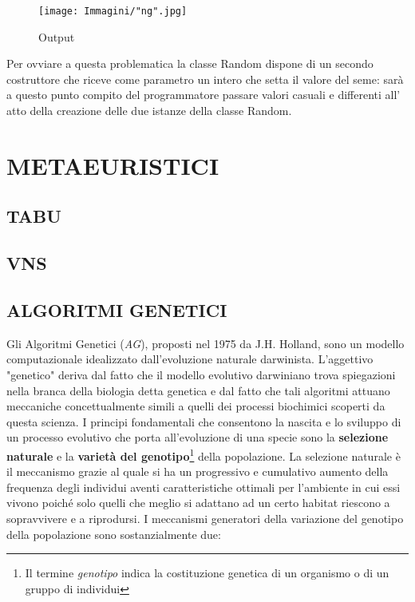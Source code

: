 \documentclass[11pt]{article}
\begin{document}
\begin{figure}[htbp]
    \centering
    \texttt{[image: Immagini/"ng".jpg]}
    \caption{Output}
\end{figure}

Per ovviare a questa problematica la classe Random dispone di un secondo costruttore che riceve come parametro un intero che setta il valore del seme: sarà a questo punto compito del programmatore passare valori casuali e  differenti all' atto della creazione delle due istanze della classe Random.


\section*{METAEURISTICI}
\label{sec:MetaEuristiciS}

\subsection*{TABU}
\label{sec:TabuS}

\subsection*{VNS}
\label{sec:VNSS}

\subsection*{ALGORITMI GENETICI}
\label{sec:GeneticoS}

Gli Algoritmi Genetici (\textit{AG}), proposti nel 1975 da J.H. Holland, sono un modello computazionale idealizzato dall'evoluzione naturale darwinista. L'aggettivo "genetico" deriva dal fatto che il modello evolutivo darwiniano trova spiegazioni nella branca della biologia detta genetica e dal fatto che tali algoritmi attuano meccaniche concettualmente simili a quelli dei processi biochimici scoperti da questa scienza. I principi fondamentali che consentono la nascita e lo sviluppo di un processo evolutivo che porta all'evoluzione di una specie sono la \textbf{selezione naturale} e la \textbf{varietà del genotipo}\footnote{Il termine \textit{genotipo} indica la costituzione genetica di un organismo o di un gruppo di individui} della popolazione.
La selezione naturale è il meccanismo grazie al quale si ha un progressivo e cumulativo aumento della frequenza degli individui aventi caratteristiche ottimali per l'ambiente in cui essi vivono poiché solo quelli che meglio si adattano ad un certo habitat riescono a sopravvivere e a riprodursi.
I meccanismi generatori della variazione del genotipo della popolazione sono sostanzialmente due:
\end{document}
